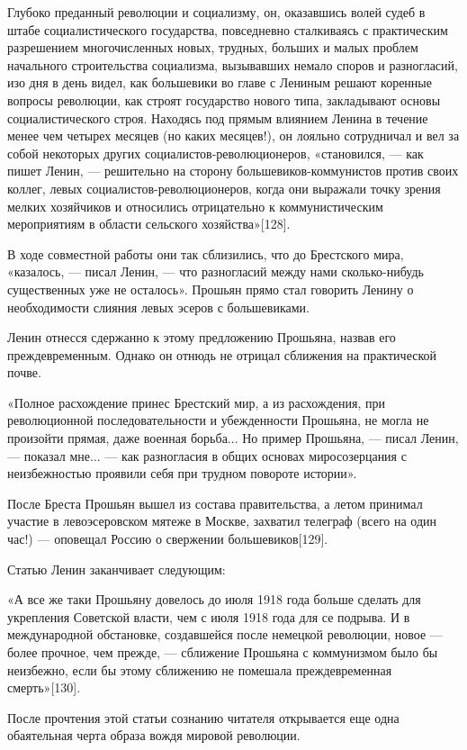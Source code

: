 \documentclass[12pt, a4paper, openany]{book}
\begin{document}
Глубоко преданный революции и социализму, он, оказавшись волей судеб в штабе социалистического государства, повседневно сталкиваясь с практическим разрешением многочисленных новых, трудных, больших и малых проблем начального строительства социализма, вызывавших немало споров и разногласий, изо дня в день видел, как большевики во главе с Лениным решают коренные вопросы революции, как строят государство нового типа, закладывают основы социалистического строя. Находясь под прямым влиянием Ленина в течение менее чем четырех месяцев (но каких месяцев!), он лояльно сотрудничал и вел за собой некоторых других социалистов-революционеров, «становился, — как пишет Ленин, — решительно на сторону большевиков-коммунистов против своих коллег, левых социалистов-революционеров, когда они выражали точку зрения мелких хозяйчиков и относились отрицательно к коммунистическим мероприятиям в области сельского хозяйства»[128].

В ходе совместной работы они так сблизились, что до Брестского мира, «казалось, — писал Ленин, — что разногласий между нами сколько-нибудь существенных уже не осталось». Прошьян прямо стал говорить Ленину о необходимости слияния левых эсеров с большевиками.

Ленин отнесся сдержанно к этому предложению Прошьяна, назвав его преждевременным. Однако он отнюдь не отрицал сближения на практической почве.

«Полное расхождение принес Брестский мир, а из расхождения, при революционной последовательности и убежденности Прошьяна, не могла не произойти прямая, даже военная борьба... Но пример Прошьяна, — писал Ленин, — показал мне... — как разногласия в общих основах миросозерцания с неизбежностью проявили себя при трудном повороте истории».

После Бреста Прошьян вышел из состава правительства, а летом принимал участие в левоэсеровском мятеже в Москве, захватил телеграф (всего на один час!) — оповещал Россию о свержении большевиков[129].

Статью Ленин заканчивает следующим:

«А все же таки Прошьяну довелось до июля 1918 года больше сделать для укрепления Советской власти, чем с июля 1918 года для се подрыва. И в международной обстановке, создавшейся после немецкой революции, новое — более прочное, чем прежде, — сближение Прошьяна с коммунизмом было бы неизбежно, если бы этому сближению не помешала преждевременная смерть»[130].

После прочтения этой статьи сознанию читателя открывается еще одна обаятельная черта образа вождя мировой революции.
\end{document}
